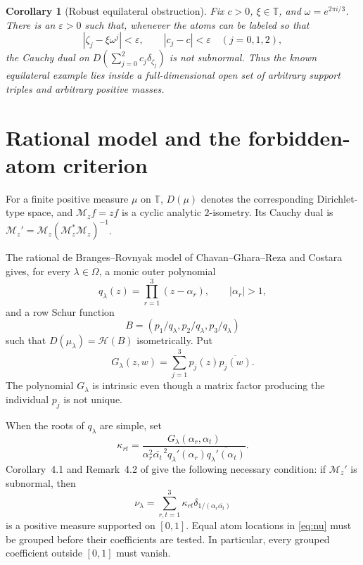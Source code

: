 \documentclass[11pt]{article}
\newtheorem{corollary}[theorem]{Corollary}
\newcommand{\T}{\mathbb T}
\newcommand{\Mz}{\mathscr M_z}
\begin{document}
\begin{corollary}[Robust equilateral obstruction]\label{cor:stability}
Fix $c>0$, $\xi\in\T$, and $\omega=e^{2\pi i/3}$.  There is an
$\varepsilon>0$ such that, whenever the atoms can be labeled so that
\[
 |\zeta_j-\xi\omega^j|<\varepsilon,
 \qquad |c_j-c|<\varepsilon \quad (j=0,1,2),
\]
the Cauchy dual on
$D(\sum_{j=0}^2c_j\delta_{\zeta_j})$ is not subnormal.
Thus the known equilateral example lies inside a full-dimensional open set
of arbitrary support triples and arbitrary positive masses.
\end{corollary}

\section{Rational model and the forbidden-atom criterion}

For a finite positive measure $\mu$ on $\T$, $D(\mu)$ denotes the
corresponding Dirichlet-type space, and $\Mz f=zf$ is a cyclic analytic
$2$-isometry.  Its Cauchy dual is
$\Mz'=\Mz(\Mz^*\Mz)^{-1}$.

The rational de Branges--Rovnyak model of Chavan--Ghara--Reza and Costara
\cite{CGR,Costara} gives, for every $\lambda\in\Omega$, a monic outer
polynomial
\[
 q_\lambda(z)=\prod_{r=1}^3(z-\alpha_r),\qquad |\alpha_r|>1,
\]
and a row Schur function
\[
 B=(p_1/q_\lambda,p_2/q_\lambda,p_3/q_\lambda)
\]
such that $D(\mu_\lambda)=\mathcal H(B)$ isometrically.  Put
\begin{equation}\label{eq:G}
 G_\lambda(z,w)=\sum_{j=1}^3p_j(z)\overline{p_j(w)}.
\end{equation}
The polynomial $G_\lambda$ is intrinsic even though a matrix factor producing
the individual $p_j$ is not unique.

When the roots of $q_\lambda$ are simple, set
\begin{equation}\label{eq:kappa}
 \kappa_{rt}=
 \frac{G_\lambda(\alpha_r,\alpha_t)}
 {\alpha_r^2\overline{\alpha_t}^{\,2}
  q_\lambda'(\alpha_r)\overline{q_\lambda'(\alpha_t)}}.
\end{equation}
Corollary~4.1 and Remark~4.2 of \cite{CGR} give the following necessary
condition: if $\Mz'$ is subnormal, then
\begin{equation}\label{eq:nu}
 \nu_\lambda=\sum_{r,t=1}^3\kappa_{rt}
 \delta_{1/(\alpha_r\overline{\alpha_t})}
\end{equation}
is a positive measure supported on $[0,1]$.  Equal atom locations in
\eqref{eq:nu} must be grouped before their coefficients are tested.  In
particular, every grouped coefficient outside $[0,1]$ must vanish.
\end{document}
